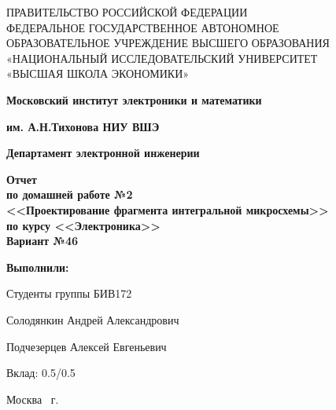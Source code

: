 \begin{titlepage}
	\begin{center}
		ПРАВИТЕЛЬСТВО РОССИЙСКОЙ ФЕДЕРАЦИИ \\
 		ФЕДЕРАЛЬНОЕ  ГОСУДАРСТВЕННОЕ АВТОНОМНОЕ \\
		ОБРАЗОВАТЕЛЬНОЕ УЧРЕЖДЕНИЕ ВЫСШЕГО ОБРАЗОВАНИЯ\\
		«НАЦИОНАЛЬНЫЙ ИССЛЕДОВАТЕЛЬСКИЙ УНИВЕРСИТЕТ\\
		«ВЫСШАЯ ШКОЛА ЭКОНОМИКИ»
	\end{center}
	
	\begin{center}
		\textbf{Московский институт электроники и математики}
		
		\textbf{им. А.Н.Тихонова НИУ ВШЭ}
		
		\vspace{2ex}
		
		\textbf{Департамент электронной инженерии}
	\end{center}
	\vspace{1ex}	
	
	\vspace{1ex}
	\begin{center}
		\textbf{Отчет\\
			по домашней работе №2\\
			<<Проектирование фрагмента интегральной микросхемы>>\\
			по курсу <<Электроника>>\\
			Вариант №46
	}
	\end{center}	

	\vspace{2ex}
	\vfill
	
	\vspace{2ex}
	
	\begin{flushright}
		\textbf{Выполнили:}
		
		\vspace{2ex}
		
		Студенты группы БИВ172
		
		\vspace{2ex}
		
		Солодянкин Андрей Александрович
		
		Подчезерцев Алексей Евгеньевич
		
		\vspace{2ex}
		
		Вклад: 0.5/0.5
	\end{flushright}

	\vspace{5ex}
	\begin{center}
		Москва \the\year \, г.
	\end{center}
	
\end{titlepage}
\addtocounter{page}{1}